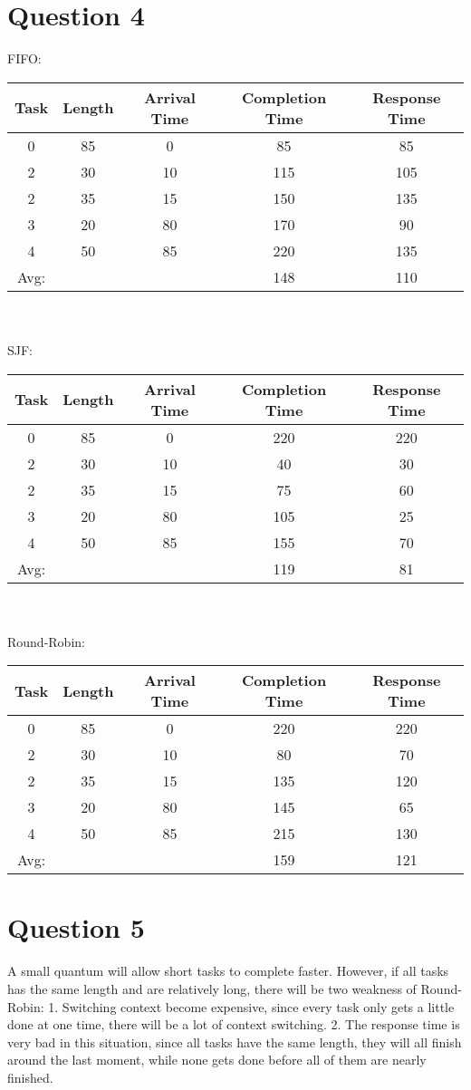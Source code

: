 \documentclass[10pt]{article}
\begin{document}
\section{Question 4}
FIFO:\\
\begin{tabular}{|c|c|c|c|c|}
\hline
Task & Length & Arrival Time & Completion Time & Response Time\\
\hline
0 & 85 & 0 & 85 & 85\\
2 & 30 & 10 & 115 & 105\\
2 & 35 & 15 & 150 & 135\\
3 & 20 & 80 & 170 & 90\\
4 & 50 & 85 & 220 & 135\\
\hline
Avg: & & & 148 & 110\\
\hline
\end{tabular}\\
\\SJF:\\
\begin{tabular}{|c|c|c|c|c|}
\hline
Task & Length & Arrival Time & Completion Time & Response Time\\
\hline
0 & 85 & 0 & 220 & 220\\
2 & 30 & 10 & 40 & 30\\
2 & 35 & 15 & 75 & 60\\
3 & 20 & 80 & 105 & 25\\
4 & 50 & 85 & 155 & 70\\
\hline
Avg: & & & 119 & 81\\
\hline
\end{tabular}\\
\\Round-Robin:\\
\begin{tabular}{|c|c|c|c|c|}
\hline
Task & Length & Arrival Time & Completion Time & Response Time\\
\hline
0 & 85 & 0 & 220 & 220\\
2 & 30 & 10 & 80 & 70\\
2 & 35 & 15 & 135 & 120\\
3 & 20 & 80 & 145 & 65\\
4 & 50 & 85 & 215 & 130\\
\hline
Avg: & & & 159 & 121\\
\hline
\end{tabular}
\section{Question 5}
A small quantum will allow short tasks to complete faster. However, if all tasks has the same length and are relatively long, there will be two weakness of Round-Robin: 1. Switching context become expensive, since every task only gets a little done at one time, there will be a lot of context switching. 2. The response time is very bad in this situation, since all tasks have the same length, they will all finish around the last moment, while none gets done before all of them are nearly finished.
\end{document}
